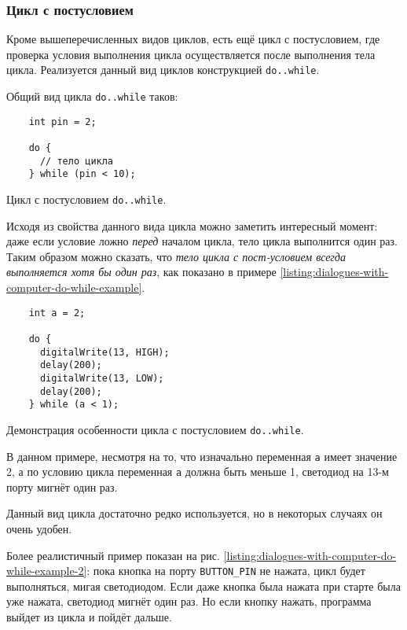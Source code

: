 \documentclass[../sparc.tex]{subfiles}
\begin{document}
\subsubsection{Цикл с постусловием}

Кроме вышеперечисленных видов циклов, есть ещё цикл с постусловием, где
проверка условия выполнения цикла осуществляется после выполнения тела цикла.
Реализуется данный вид циклов конструкцией \texttt{do..while}.

Общий вид цикла \texttt{do..while} таков:

\begin{listing}[ht]
  \begin{verbatim}
    int pin = 2;

    do {
      // тело цикла
    } while (pin < 10);
  \end{verbatim}
  \label{listing:dialogues-with-computer-do-while}
  \caption{Цикл с постусловием \texttt{do..while}.}
\end{listing}

Исходя из свойства данного вида цикла можно заметить интересный момент: даже
если условие ложно \emph{перед} началом цикла, тело цикла выполнится один раз.
Таким образом можно сказать, что \emph{тело цикла с пост-условием всегда
выполняется хотя бы один раз}, как показано в примере
\ref{listing:dialogues-with-computer-do-while-example}.

\begin{listing}[ht]
  \begin{verbatim}
    int a = 2;

    do {
      digitalWrite(13, HIGH);
      delay(200);
      digitalWrite(13, LOW);
      delay(200);
    } while (a < 1);
  \end{verbatim}
  \label{listing:dialogues-with-computer-do-while-example}
  \caption{Демонстрация особенности цикла с постусловием \texttt{do..while}.}
\end{listing}

В данном примере, несмотря на то, что изначально переменная \texttt{a} имеет
значение 2, а по условию цикла переменная \texttt{a} должна быть меньше 1,
светодиод на 13-м порту мигнёт один раз.

Данный вид цикла достаточно редко используется, но в некоторых случаях он очень
удобен.

Более реалистичный пример показан на
рис. \ref{listing:dialogues-with-computer-do-while-example-2}: пока кнопка на
порту \texttt{BUTTON\_PIN} не нажата, цикл будет выполняться, мигая светодиодом.
Если даже кнопка была нажата при старте была уже нажата, светодиод мигнёт один
раз.  Но если кнопку нажать, программа выйдет из цикла и пойдёт дальше.
\end{document}
